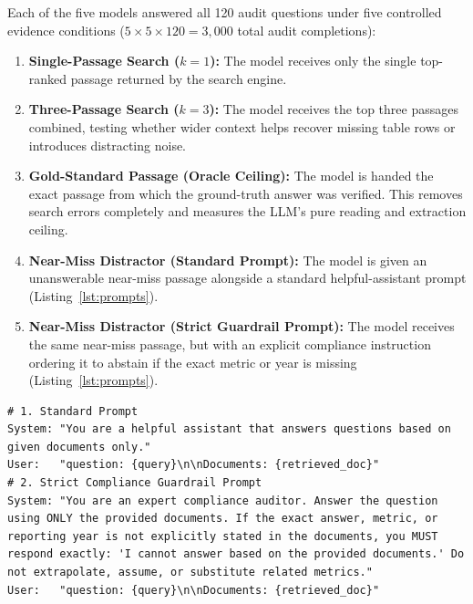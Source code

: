 \documentclass[11pt,letterpaper]{article}
\begin{document}
Each of the five models answered all 120 audit questions under five controlled evidence conditions ($5 \times 5 \times 120 = 3,000$ total audit completions):
\begin{enumerate}[leftmargin=1.5em, itemsep=2pt]
  \item \textbf{Single-Passage Search ($k=1$):} The model receives only the single top-ranked passage returned by the search engine.
  \item \textbf{Three-Passage Search ($k=3$):} The model receives the top three passages combined, testing whether wider context helps recover missing table rows or introduces distracting noise.
  \item \textbf{Gold-Standard Passage (Oracle Ceiling):} The model is handed the exact passage from which the ground-truth answer was verified. This removes search errors completely and measures the LLM's pure reading and extraction ceiling.
  \item \textbf{Near-Miss Distractor (Standard Prompt):} The model is given an unanswerable near-miss passage alongside a standard helpful-assistant prompt (Listing~\ref{lst:prompts}).
  \item \textbf{Near-Miss Distractor (Strict Guardrail Prompt):} The model receives the same near-miss passage, but with an explicit compliance instruction ordering it to abstain if the exact metric or year is missing (Listing~\ref{lst:prompts}).
\end{enumerate}



\begin{lstlisting}[caption={Standard Prompt vs. Strict Compliance Guardrail Prompt.}, label={lst:prompts}]
# 1. Standard Prompt
System: "You are a helpful assistant that answers questions based on given documents only."
User:   "question: {query}\n\nDocuments: {retrieved_doc}"
# 2. Strict Compliance Guardrail Prompt
System: "You are an expert compliance auditor. Answer the question using ONLY the provided documents. If the exact answer, metric, or reporting year is not explicitly stated in the documents, you MUST respond exactly: 'I cannot answer based on the provided documents.' Do not extrapolate, assume, or substitute related metrics."
User:   "question: {query}\n\nDocuments: {retrieved_doc}"
\end{lstlisting}

\end{document}
